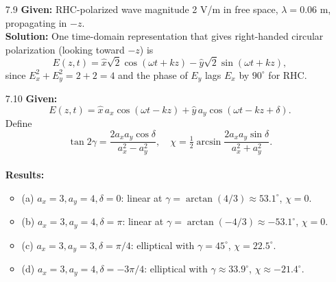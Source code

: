 \begin{enumerate}
\item[7.9] \textbf{Given:} RHC-polarized wave magnitude 2 V/m in free space, $\lambda=0.06$ m, propagating in $-z$.  
\\
\textbf{Solution:}
One time-domain representation that gives right-handed circular polarization (looking toward $-z$) is
\[
  E(z,t)=\hat x\sqrt2\cos(\omega t + kz)-\hat y\sqrt2\sin(\omega t + kz),
\]
since $E_x^2+E_y^2=2+2=4$ and the phase of $E_y$ lags $E_x$ by $90^\circ$ for RHC.

\item[7.10] \textbf{Given:}
\[E(z,t)=\hat x\,a_x\cos(\omega t - kz)+\hat y\,a_y\cos(\omega t - kz+\delta).
\]
Define
\[\tan2\gamma=\frac{2a_xa_y\cos\delta}{a_x^2-a_y^2},\quad
  \chi=\tfrac12\arcsin\frac{2a_xa_y\sin\delta}{a_x^2+a_y^2}.\]
\\
\textbf{Results:}
\begin{itemize}
  \item (a) $a_x=3,a_y=4,\delta=0$: linear at $\gamma=\arctan(4/3)\approx53.1^\circ$, $\chi=0$.  
  \item (b) $a_x=3,a_y=4,\delta=\pi$: linear at $\gamma=\arctan(-4/3)\approx-53.1^\circ$, $\chi=0$.  
  \item (c) $a_x=3,a_y=3,\delta=\pi/4$: elliptical with $\gamma=45^\circ$, $\chi=22.5^\circ$.  
  \item (d) $a_x=3,a_y=4,\delta=-3\pi/4$: elliptical with $\gamma\approx33.9^\circ$, $\chi\approx-21.4^\circ$.  
\end{itemize}

\end{enumerate}

